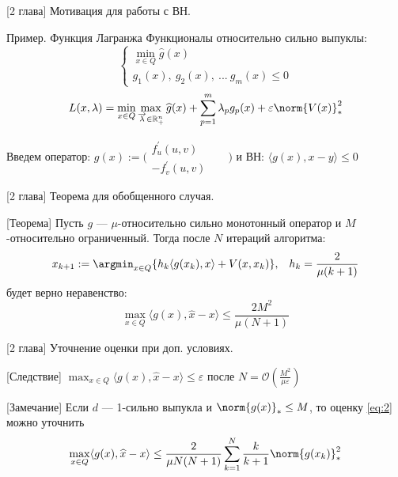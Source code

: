 \begin{frame}{[2 глава] Мотивация для работы с ВН.}
    \begin{exampleblock}{Пример. Функция Лагранжа}
        Функционалы относительно сильно выпуклы:
        $$
        \left\{\begin{aligned}
            \min_{x \in Q} \widehat{g}(x)\\
             g_1(x){,\:}g_2(x){,\:}...\:g_m(x) \leq 0
        \end{aligned}\right.
        $$
        $$L(x, \lambda) = \min_{x \in Q} \max_{\overrightarrow{\lambda} \in \mathbb{R}_+^n} \widehat{g}(x) + \sum_{p=1}^{m} \lambda_p g_p(x) + \varepsilon \norm{V(x)}_*^2$$
    \end{exampleblock}
    Введем оператор:
    $ g(x) := \Bigg( 
      \begin{aligned}
        f^{'}_{u}(u,v)&&\\
        -f^{'}_{v}(u,v)&&
      \end{aligned}
      \Bigg) $
    и ВН: $\langle g(x), x - y \rangle \leq 0$
\end{frame}


\begin{frame}{[2 глава] Теорема для обобщенного случая.}
    \begin{block}{[Теорема]}
        Пусть $g$ --- $\mu$-относительно сильно монотонный оператор и $M$-относительно ограниченный. Тогда после $N$ итераций алгоритма: 
        $$ x_{k+1} := \argmin_{x \in Q} \{ h_k \langle g(x_k), x\rangle + V(x, x_k)\}, \;\;\; h_k = \frac{2}{\mu (k+1)}$$
        будет верно неравенство:
        \begin{equation}\label{eq:2}
            \max_{x \in Q} \langle g(x), \widehat{x} - x\rangle \leq \frac{2 M^2}{\mu (N+1)}
        \end{equation}
    \end{block}
\end{frame}


\begin{frame}{[2 глава] Уточнение оценки при доп. условиях.}
    \begin{block}{[Следствие]}
         $ \max_{x \in Q} \langle g(x), \widehat{x} - x\rangle \leq \varepsilon$
        после $N = \mathcal{O}(\frac{M^2}{\mu \varepsilon})$
    \end{block}
    \begin{block}{[Замечание]}
        Если $d$ --- 1-сильно выпукла и $\norm{g(x)}_* \leq M$, то оценку \eqref{eq:2} можно уточнить
        \begin{equation}
            \max_{x \in Q} \langle g(x), \widehat{x} - x\rangle \leq \frac{2}{\mu N (N+1)} \sum_{k=1}^{N} \frac{k}{k+1} \norm{g(x_k)}_*^2
        \end{equation}
    \end{block}
\end{frame}


